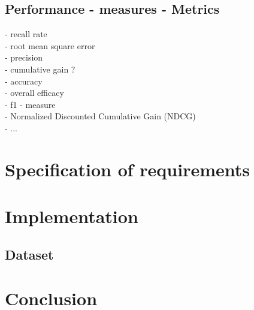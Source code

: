 \documentclass[10pt,oneside,english,a4paper]{article}
\begin{document}
\clearpage
\subsection{Performance - measures - Metrics}
- recall rate\\
- root mean square error\\
- precision\\
- cumulative gain ?\\
- accuracy\\
- overall efficacy\\
- f1 - measure\\
- Normalized Discounted Cumulative Gain (NDCG)\\
- ...\\












































\clearpage
\section{Specification of requirements}

\clearpage{}
\section{Implementation}

\subsection{Dataset}


\clearpage{}
\section{Conclusion}


\clearpage
\thispagestyle{empty}
\mbox{}
\clearpage








\clearpage 
\normalsize 
 
 
\nocite{*}
\end{document}
